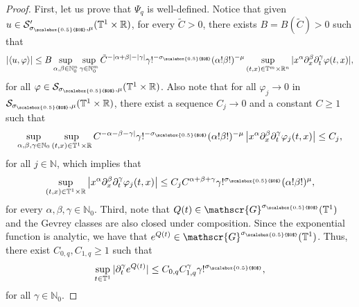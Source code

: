 \documentclass[11pt,reqno]{amsart}
\numberwithin{equation}{section}
\theoremstyle{definition}
\theoremstyle{definition}
\newcommand{\T}{\mathbb{T}}
\newcommand{\G}{\mathnormal{\mathbb{T}^{m}\times\mathbb{R}^n}}
\newcommand{\R}{\mathbb{R}}
\newcommand{\N}{\mathbb{N}}
\newcommand{\g}{\mathbb{T}^1\times\mathbb{R}}
\newcommand{\scoef}{\mathcal{S}_{\sigma_{\scalebox{0.5}{$0$}},\mu}(\g)}
\newcommand{\sscoef}{\mathcal{S}'_{\sigma_{\scalebox{0.5}{$0$}},\mu}(\g)}
\newcommand{\sigmac}{\sigma_{\scalebox{0.5}{$0$}}}
\begin{document}
\begin{proof}
    First, let us prove that $\Psi_q$ is well-defined. Notice that given $u\in\sscoef$, for every  $\tilde C>0$, there exists $B=B(\tilde C)>0$ such that 
    \begin{equation*}
        |\langle u,\varphi\rangle| \leq B\sup_{\alpha,\beta\in\N_0^n}\sup_{\gamma\in\N_0^m} \tilde C^{-|\alpha+\beta|-|\gamma|}\gamma!^{-\sigmac}(\alpha!\beta!)^{-\mu}\sup_{(t,x)\in\G}|x^\alpha\partial_x^\beta\partial_t^\gamma\varphi(t,x)|,
    \end{equation*} 
    for all $\varphi\in\scoef$. Also note that for all $\varphi_j\to0$ in $\scoef$, there exist a sequence $C_j\to0$ and a constant $C\geq 1$ such that
    \begin{equation*}
       \sup_{\alpha,\beta,\gamma\in\N_0}\sup_{(t,x)\in\T^1\times\R} {C}^{-\alpha-\beta-\gamma|}\gamma!^{-\sigmac}(\alpha!\beta!)^{-\mu}\left|x^\alpha\partial_x^\beta\partial_t^\gamma \varphi_j(t,x)\right|\leq C_j,
    \end{equation*}
    for all $j\in\N$, which implies that
        \begin{equation*}
       \sup_{(t,x)\in\T^1\times\R} \left|x^\alpha\partial_x^\beta\partial_t^\gamma \varphi_j(t,x) \right| \leq C_j {C}^{\alpha+\beta+\gamma}\gamma!^{\sigmac}(\alpha!\beta!)^{\mu},
    \end{equation*}
    for every $\alpha,\beta,\gamma\in\N_0$. 
    Third, note that $Q(t)\in\mathscr{G}^{\sigmac}(\T^1)$ and the Gevrey classes are also closed under composition. Since the exponential function is analytic, we have that $e^{Q(t)}\in\mathscr{G}^{\sigmac}(\T^1)$. Thus, there exist $C_{0,q},C_{1,q}\geq 1$ such that
    \[\sup_{t\in\T^1}|\partial_t^\gamma e^{Q(t)}|\leq C_{0,q}C_{1,q}^\gamma\gamma!^{\sigmac},\]
    for all $\gamma\in\N_0$.
    

\end{proof}
\end{document}
